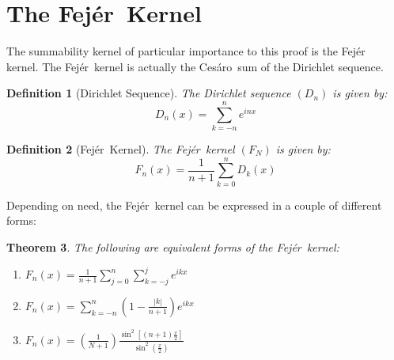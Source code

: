\documentclass[letterpaper,12pt,fleqn,reqno]{amsart}
\theoremstyle{plain}
\newtheorem{theorem}{Theorem}[section]
\newtheorem{definition}[theorem]{Definition}
\newcommand{\abs}[1]{\left|#1\right|}
\newcommand{\Fej}{Fej\'{e}r\ }
\newcommand{\Ces}{Ces\'{a}ro\ }
\begin{document}
\section{The \Fej Kernel}

The summability kernel of particular importance to this proof is the \Fej
kernel. The \Fej kernel is actually the \Ces sum of the Dirichlet sequence.

\begin{definition}[Dirichlet Sequence]
  The Dirichlet sequence $(D_n)$ is given by:
  \[D_n(x)=\sum_{k=-n}^ne^{inx}\]
\end{definition}

\begin{definition}[\Fej Kernel]
  The \Fej kernel $(F_N)$ is given by:
  \[F_n(x)=\frac{1}{n+1}\sum_{k=0}^nD_k(x)\]
\end{definition}

Depending on need, the \Fej kernel can be expressed in a couple of different
forms:

\begin{theorem}
  \label{thm:forms}
  The following are equivalent forms of the \Fej kernel:
  \begin{enumerate}
  \item $F_n(x)=\frac{1}{n+1}\sum_{j=0}^n\sum_{k=-j}^je^{ikx}$

  \item $F_n(x)=\sum_{k=-n}^n\left(1-\frac{\abs{k}}{n+1}\right)e^{ikx}$

  \item $F_n(x)=\left(\frac{1}{N+1}\right)
    \frac{\sin^2\left[(n+1)\frac{x}{2}\right]}{\sin^2\left(\frac{x}{2}\right)}$
  \end{enumerate}
\end{theorem}
\end{document}

